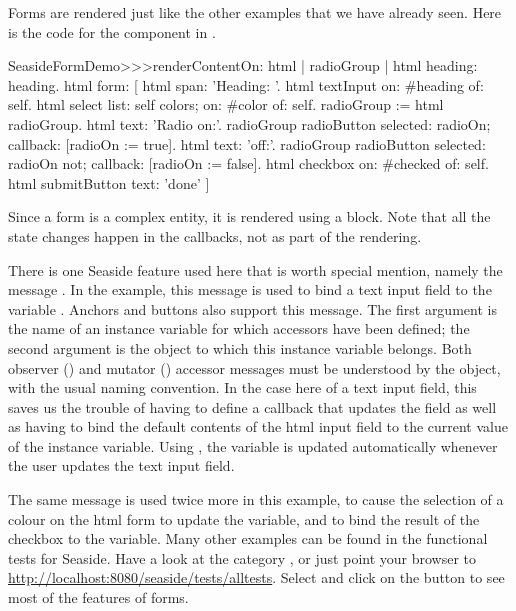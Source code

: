 \documentclass[a4paper,10pt,twoside]{book}
\begin{document}
Forms are rendered just like the other examples that we have already seen.
Here is the code for the  component in .

\begin{code}{}
SeasideFormDemo>>>renderContentOn: html
	| radioGroup |
	html heading: heading.
	html form: [
		html span: 'Heading: '.
		html textInput on: #heading of: self.
		html select
			list: self colors;
			on: #color of: self.
		radioGroup := html radioGroup.
		html text: 'Radio on:'.
		radioGroup radioButton
			selected: radioOn;
			callback: [radioOn := true].
		html text: 'off:'.
		radioGroup radioButton
			selected: radioOn not;
			callback: [radioOn := false].
		html checkbox on: #checked of: self.
		html submitButton
			text: 'done' ]
\end{code}{}

Since a form is a complex entity, it is rendered using a block.
Note that all the state changes happen in the callbacks, not as part of the rendering.

There is one Seaside feature used here that is worth special mention, namely the message
.
In the example, this message is used to bind a text input field to the variable
.
Anchors and buttons also support this message.
The first argument is the name of an instance variable for which accessors have been
defined; the second argument is the object to which this instance variable belongs.
Both observer () and mutator () accessor messages must be
understood by the object, with the usual naming convention.
In the case here of a text input field, this saves us the trouble of having to define a
callback that updates the field as well as having to bind the default contents of the
html input field to the current value of the instance variable.
Using , the  variable is updated automatically
whenever the user updates the text input field.

The same message is used twice more in this example, to cause the selection of a colour
on the html form to update the  variable, and to bind the result of the
checkbox to the  variable.
Many other examples can be found in the functional tests for Seaside.
Have a look at the category , or just point your browser
to \url{http://localhost:8080/seaside/tests/alltests}.
Select  and click on the  button to see most of the
features of forms.
\end{document}
